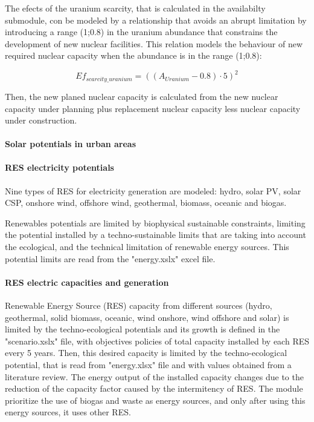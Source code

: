 The efects of the uranium scarcity, that is calculated in the availabilty submodule, con be modeled by a relationship that avoids an abrupt limitation by introducing a range (1;0.8) in the uranium abundance that constrains the development of new nuclear facilities. This relation models the behaviour of new required nuclear capacity when the abundance is in the range (1;0.8):

\begin{equation}
Ef_{scarcity\_uranium}=  ((A_{Uranium}-0.8) \cdot 5)^2
\label{eq:effects-uranium-scarcity}
\end{equation}

Then, the new planed nuclear capacity is calculated from the new nuclear capacity under planning plus replacement nuclear capacity less nuclear capacity under construction.

\paragraph{Solar potentials in urban areas}


\paragraph{RES electricity potentials}

Nine types of RES for electricity generation are modeled: hydro, solar PV, solar CSP, onshore wind, offshore wind, geothermal, biomass, oceanic and biogas.

Renewables potentials are limited by biophysical sustainable constraints, limiting the potential installed by a techno-sustainable limits that are taking into account the ecological, and the technical limitation of renewable energy sources. This potential limits are read from the "energy.xslx" excel file.

\paragraph{RES electric capacities and generation}

Renewable Energy Source (RES) capacity from different sources (hydro, geothermal, solid biomass, oceanic, wind onshore, wind offshore and solar) is limited by the techno-ecological potentials and its growth is defined in the "scenario.xslx" file, with objectives policies of total capacity installed by each RES every 5 years.  
Then, this desired capacity is limited by the techno-ecological potential, that is read from "energy.xlsx" file and with values obtained from a literature review. The energy output of the installed capacity changes due to the reduction of the capacity factor caused by the intermitency of RES. The module prioritize the use of biogas and waste as energy sources, and only after using this energy sources, it uses other RES.



